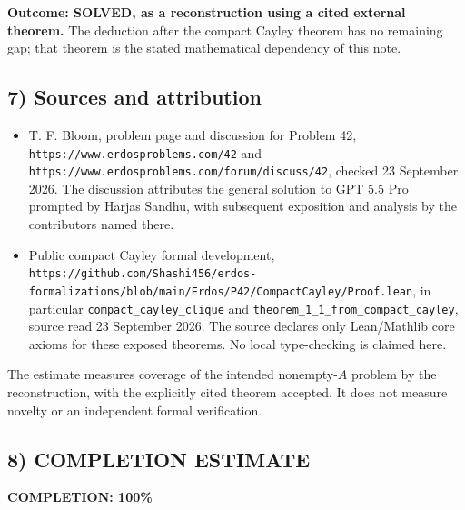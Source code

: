 \textbf{Outcome: SOLVED, as a reconstruction using a cited external
theorem.} The deduction after the compact Cayley theorem has no remaining
gap; that theorem is the stated mathematical dependency of this note.

\subsection{7) Sources and attribution}
\begin{itemize}
\item T. F. Bloom, problem page and discussion for Problem 42,
\texttt{https://www.erdosproblems.com/42} and
\texttt{https://www.erdosproblems.com/forum/discuss/42}, checked
23 September 2026. The discussion attributes the general solution to
GPT 5.5 Pro prompted by Harjas Sandhu, with subsequent exposition and
analysis by the contributors named there.
\item Public compact Cayley formal development,
\texttt{https://github.com/Shashi456/erdos-formalizations/blob/main/Erdos/P42/CompactCayley/Proof.lean},
in particular \texttt{compact\_cayley\_clique} and
\texttt{theorem\_1\_1\_from\_compact\_cayley}, source read
23 September 2026. The source declares only Lean/Mathlib core axioms
for these exposed theorems. No local type-checking is claimed here.
\end{itemize}

The estimate measures coverage of the intended nonempty-$A$ problem by
the reconstruction, with the explicitly cited theorem accepted. It does
not measure novelty or an independent formal verification.
\subsection{8) COMPLETION ESTIMATE}
\textbf{COMPLETION: 100\%}
